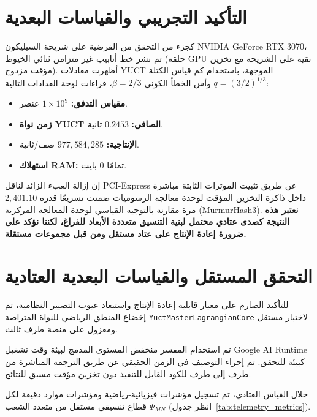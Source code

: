 \documentclass[11pt,a4paper]{article}
\begin{document}
	\section{التأكيد التجريبي والقياسات البعدية}
	كجزء من التحقق من الفرضية على شريحة السيليكون NVIDIA GeForce RTX 3070، تم نشر خط أنابيب غير متزامن ثنائي الخيوط (حلقة GPU نقية على الشريحة مع تخزين مؤقت مزدوج). أظهرت معادلات YUCT الموجهة، باستخدام كم قياس الكتلة $q = (3/2)^{1/3}$ وأس الخطأ الكوني $\beta = 2/3$، قراءات لوحة العدادات التالية:
	\begin{itemize}
		\item \textbf{مقياس التدفق:} $1 \times 10^9$ عنصر.
		\item \textbf{زمن نواة YUCT الصافي:} $0.2453$ ثانية.
		\item \textbf{الإنتاجية:} $977,584,285$ صف/ثانية.
		\item \textbf{استهلاك RAM:} تمامًا $0$ بايت.
	\end{itemize}
	
	إن إزالة العبء الزائد لناقل PCI-Express عن طريق تثبيت الموترات الثابتة مباشرة داخل ذاكرة التخزين المؤقت لوحدة معالجة الرسوميات ضمنت تسريعًا قدره $2,401.10$ مرة مقارنة بالتوجيه القياسي لوحدة المعالجة المركزية (MurmurHash3). \textbf{نعتبر هذه النتيجة كصدى عتادي محتمل لبنية التنسيق متعددة الأبعاد للفراغ، لكننا نؤكد على ضرورة إعادة الإنتاج على عتاد مستقل ومن قبل مجموعات مستقلة.}
	
	\section{التحقق المستقل والقياسات البعدية العتادية}
	للتأكيد الصارم على معيار قابلية إعادة الإنتاج واستبعاد عيوب التصيير النظامية، تم إخضاع المنطق الرياضي للنواة المتراصة \texttt{YuctMasterLagrangianCore} لاختبار مستقل ومعزول على منصة طرف ثالث.
	
	تم استخدام المفسر منخفض المستوى المدمج لبيئة وقت تشغيل Google AI Runtime كبيئة للتحقق. تم إجراء التوصيف في الزمن الحقيقي عن طريق الترجمة المباشرة من طرف إلى طرف للكود القابل للتنفيذ دون تخزين مؤقت مسبق للنتائج.
	
	خلال القياس العتادي، تم تسجيل مؤشرات فيزيائية-رياضية ومؤشرات موارد دقيقة لكل قطاع تنسيقي مستقل من متعدد الشعب $\Psi_{MN}$ (انظر جدول~\ref{tab:telemetry_metrics}).
	
\end{document}
